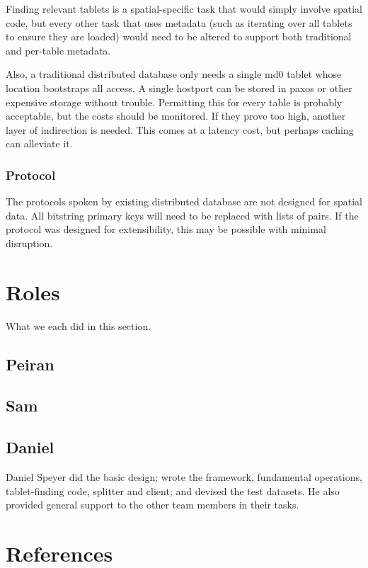 \documentclass[11pt]{article}
\begin{document}
Finding relevant tablets is a spatial-specific task that would simply involve spatial code, but every other task that uses metadata (such as iterating over all tablets to ensure they are loaded) would need to be altered to support both traditional and per-table metadata.

Also, a traditional distributed database only needs a single md0 tablet whose location bootstraps all access.  A single hostport can be stored in paxos or other expensive storage without trouble.  Permitting this for every table is probably acceptable, but the costs should be monitored.  If they prove too high, another layer of indirection is needed.  This comes at a latency cost, but perhaps caching can alleviate it.

\subsubsection{Protocol}

The protocols spoken by existing distributed database are not designed for spatial data.  All bitstring primary keys will need to be replaced with lists of pairs.  If the protocol was designed for extensibility, this may be possible with minimal disruption.

\section{Roles}
What we each did in this section.
\subsection{Peiran}

\subsection{Sam}

\subsection{Daniel}

Daniel Speyer did the basic design; wrote the framework, fundamental operations, tablet-finding code, splitter and client; and devised the test datasets.  He also provided general support to the other team members in their tasks.

\section{References}
\end{document}

